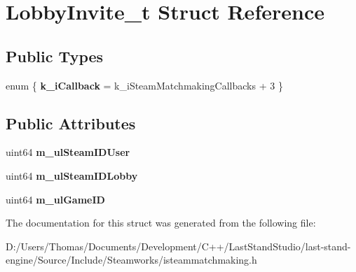 \hypertarget{structLobbyInvite__t}{}\section{Lobby\+Invite\+\_\+t Struct Reference}
\label{structLobbyInvite__t}
\subsection*{Public Types}
\begin{DoxyCompactItemize}
\item 
\hypertarget{structLobbyInvite__t_a4e033b7b067e89c97fcf7f0b023dee11}{}enum \{ {\bfseries k\+\_\+i\+Callback} = k\+\_\+i\+Steam\+Matchmaking\+Callbacks + 3
 \}\label{structLobbyInvite__t_a4e033b7b067e89c97fcf7f0b023dee11}

\end{DoxyCompactItemize}
\subsection*{Public Attributes}
\begin{DoxyCompactItemize}
\item 
\hypertarget{structLobbyInvite__t_aaba5b1cf3c1c2d20c33b87bb086c74aa}{}uint64 {\bfseries m\+\_\+ul\+Steam\+I\+D\+User}\label{structLobbyInvite__t_aaba5b1cf3c1c2d20c33b87bb086c74aa}

\item 
\hypertarget{structLobbyInvite__t_a243c336486a8b0fab08f53c1c7a6ddae}{}uint64 {\bfseries m\+\_\+ul\+Steam\+I\+D\+Lobby}\label{structLobbyInvite__t_a243c336486a8b0fab08f53c1c7a6ddae}

\item 
\hypertarget{structLobbyInvite__t_a5233bdc26ba620a23985fe667098d56a}{}uint64 {\bfseries m\+\_\+ul\+Game\+I\+D}\label{structLobbyInvite__t_a5233bdc26ba620a23985fe667098d56a}

\end{DoxyCompactItemize}


The documentation for this struct was generated from the following file\+:\begin{DoxyCompactItemize}
\item 
D\+:/\+Users/\+Thomas/\+Documents/\+Development/\+C++/\+Last\+Stand\+Studio/last-\/stand-\/engine/\+Source/\+Include/\+Steamworks/isteammatchmaking.\+h\end{DoxyCompactItemize}
